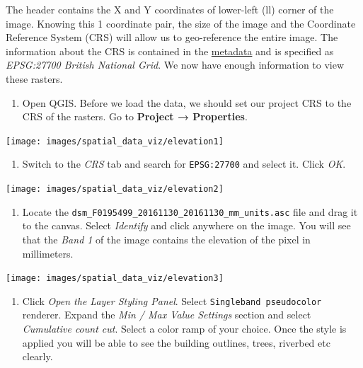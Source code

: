 \documentclass[
  12pt,
  a4paper]{article}
\providecommand{\tightlist}{%
  \setlength{\itemsep}{0pt}\setlength{\parskip}{0pt}}
\begin{document}
The header contains the X and Y coordinates of lower-left (ll) corner of
the image. Knowing this 1 coordinate pair, the size of the image and the
Coordinate Reference System (CRS) will allow us to geo-reference the
entire image. The information about the CRS is contained in the
\href{https://ckan.publishing.service.gov.uk/harvest/object/2533c88a-ccf2-41d7-8ac7-704c46bfd177/html}{metadata}
and is specified as \emph{EPSG:27700 British National Grid}. We now have
enough information to view these rasters.

\begin{enumerate}
\def\labelenumi{\arabic{enumi}.}
\tightlist
\item
  Open QGIS. Before we load the data, we should set our project CRS to
  the CRS of the rasters. Go to \textbf{Project → Properties}.
\end{enumerate}

\begin{center}\texttt{[image: images/spatial\_data\_viz/elevation1]} \end{center}

\begin{enumerate}
\def\labelenumi{\arabic{enumi}.}
\setcounter{enumi}{1}
\tightlist
\item
  Switch to the \emph{CRS} tab and search for \texttt{EPSG:27700} and
  select it. Click \emph{OK}.
\end{enumerate}

\begin{center}\texttt{[image: images/spatial\_data\_viz/elevation2]} \end{center}

\begin{enumerate}
\def\labelenumi{\arabic{enumi}.}
\setcounter{enumi}{2}
\tightlist
\item
  Locate the \texttt{dsm\_F0195499\_20161130\_20161130\_mm\_units.asc}
  file and drag it to the canvas. Select \emph{Identify} and click
  anywhere on the image. You will see that the \emph{Band 1} of the
  image contains the elevation of the pixel in millimeters.
\end{enumerate}

\begin{center}\texttt{[image: images/spatial\_data\_viz/elevation3]} \end{center}

\begin{enumerate}
\def\labelenumi{\arabic{enumi}.}
\setcounter{enumi}{3}
\tightlist
\item
  Click \emph{Open the Layer Styling Panel}. Select
  \texttt{Singleband\ pseudocolor} renderer. Expand the \emph{Min / Max
  Value Settings} section and select \emph{Cumulative count cut}. Select
  a color ramp of your choice. Once the style is applied you will be
  able to see the building outlines, trees, riverbed etc clearly.
\end{enumerate}
\end{document}
